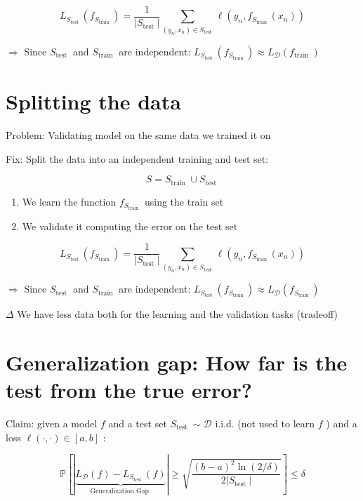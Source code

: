 $$
L_{S_{\text {test }}}\left(f_{S_{\text {train }}}\right)=\frac{1}{\left|S_{\text {test }}\right|} \sum_{\left(y_{n}, x_{n}\right) \in S_{\text {test }}} \ell\left(y_{n}, f_{S_{\text {train }}}\left(x_{n}\right)\right)
$$

$\Rightarrow$ Since $S_{\text {test }}$ and $S_{\text {train }}$ are independent: $L_{S_{\text {test }}}\left(f_{S_{\text {train }}}\right) \approx L_{\mathscr{D}}\left(f_{\text {train }}\right)$

\section*{Splitting the data}
Problem: Validating model on the same data we trained it on

Fix: Split the data into an independent training and test set:

$$
S=S_{\text {train }} \cup S_{\text {test }}
$$

\begin{enumerate}
  \item We learn the function $f_{S_{\text {train }}}$ using the train set

  \item We validate it computing the error on the test set

\end{enumerate}

$$
L_{S_{\text {test }}}\left(f_{S_{\text {train }}}\right)=\frac{1}{\left|S_{\text {test }}\right|} \sum_{\left(y_{n}, x_{n}\right) \in S_{\text {test }}} \ell\left(y_{n}, f_{S_{\text {train }}}\left(x_{n}\right)\right)
$$

$\Rightarrow$ Since $S_{\text {test }}$ and $S_{\text {train }}$ are independent: $L_{S_{\text {test }}}\left(f_{S_{\text {train }}}\right) \approx L_{\mathscr{D}}\left(f_{S_{\text {train }}}\right)$

$\Delta$ We have less data both for the learning and the validation tasks (tradeoff)

\section*{Generalization gap: How far is the test from the true error?}
Claim: given a model $f$ and a test set $S_{\text {test }} \sim \mathscr{D}$ i.i.d. (not used to learn $f$ ) and a loss $\ell(\cdot, \cdot) \in[a, b]$ :

$$
\mathbb{P}\left[|\underbrace{L_{\mathscr{D}}(f)-L_{S_{\text {test }}}(f)}_{\text {Generalization Gap }}| \geq \sqrt{\frac{(b-a)^{2} \ln (2 / \delta)}{2\left|S_{\text {test }}\right|}}\right] \leq \delta
$$

